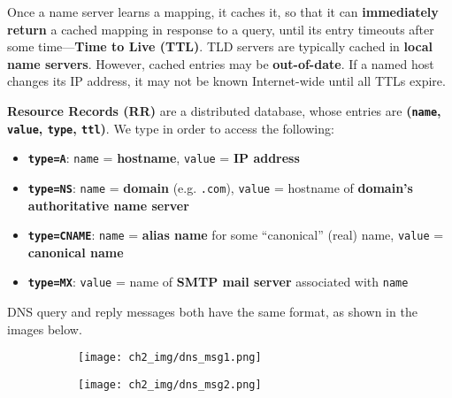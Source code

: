 \documentclass[12pt,a4paper]{article}
\begin{document}

\noindent Once a name server learns a mapping, it caches it, so that it can \textbf{immediately return} a cached mapping in response to a query, until its entry timeouts after some time---\textbf{Time to Live (TTL)}. TLD servers are typically cached in \textbf{local name servers}. However, cached entries may be \textbf{out-of-date}. If a named host changes its IP address, it may not be known Internet-wide until all TTLs expire. \\


\noindent \textbf{Resource Records (RR)} are a distributed database, whose entries are \textbf{(\texttt{name}, \texttt{value}, \texttt{type}, \texttt{ttl})}. We type  in order to access the following:

\begin{itemize}
  \item \textbf{\texttt{type=A}}: \texttt{name} = \textbf{hostname}, \texttt{value} = \textbf{IP address}
  \item \textbf{\texttt{type=NS}}: \texttt{name} = \textbf{domain} (e.g. \texttt{.com}), \texttt{value} = hostname of \textbf{domain's authoritative name server}
  \item \textbf{\texttt{type=CNAME}}: \texttt{name} = \textbf{alias name} for some ``canonical'' (real) name, \texttt{value} = \textbf{canonical name}
  \item \textbf{\texttt{type=MX}}: \texttt{value} = name of \textbf{SMTP mail server} associated with \texttt{name}
\end{itemize}


\noindent DNS query and reply messages both have the same format, as shown in the images below.

\begin{figure}[h]
  \centering
  \begin{subfigure}[t]{0.48\textwidth}
    \centering
    \texttt{[image: ch2\_img/dns\_msg1.png]}
  \end{subfigure}
  \hfill
  \begin{subfigure}[t]{0.48\textwidth}
    \centering
    \texttt{[image: ch2\_img/dns\_msg2.png]}
  \end{subfigure}
\end{figure}
\end{document}

